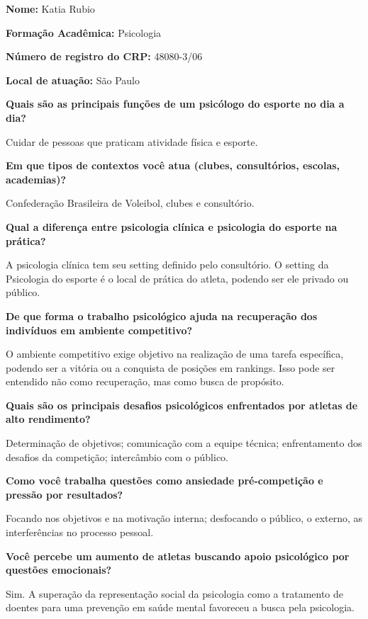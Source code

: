 
\textbf{Nome:} Katia Rubio

\textbf{Formação Acadêmica:} Psicologia

\textbf{Número de registro do CRP:} 48080-3/06

\textbf{Local de atuação:} São Paulo

\textbf{Quais são as principais funções de um psicólogo do esporte no dia a dia?}

Cuidar de pessoas que praticam atividade física e esporte.

\textbf{Em que tipos de contextos você atua (clubes, consultórios, escolas, academias)?}

Confederação Brasileira de Voleibol, clubes e consultório.

\textbf{Qual a diferença entre psicologia clínica e psicologia do esporte na prática?}

A psicologia clínica tem seu setting definido pelo consultório. O setting da Psicologia do esporte é o local de prática do atleta, podendo ser ele privado ou público.

\textbf{De que forma o trabalho psicológico ajuda na recuperação dos indivíduos em ambiente competitivo?}

O ambiente competitivo exige objetivo na realização de uma tarefa específica, podendo ser a vitória ou a conquista de posições em rankings. Isso pode ser entendido não como recuperação, mas como busca de propósito.

\textbf{Quais são os principais desafios psicológicos enfrentados por atletas de alto rendimento?}

Determinação de objetivos; comunicação com a equipe técnica; enfrentamento dos desafios da competição; intercâmbio com o público.

\textbf{Como você trabalha questões como ansiedade pré-competição e pressão por resultados?}

Focando nos objetivos e na motivação interna; desfocando o público, o externo, as interferências no processo pessoal.

\textbf{Você percebe um aumento de atletas buscando apoio psicológico por questões emocionais?}

Sim. A superação da representação social da psicologia como a tratamento de doentes para uma prevenção em saúde mental favoreceu a busca pela psicologia.

